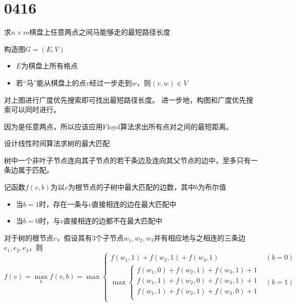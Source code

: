\section{0416}\label{sec:0416}
\begin{questions}\label{qset:0416}

    \question 求$n \times m$棋盘上任意两点之间马能够走的最短路径长度

    \begin{solution}
        构造图$G=(E,V)$\begin{itemize}
            \item $E$为棋盘上所有格点
            \item 若“马”能从棋盘上的点$v$经过一步走到$w$，则$(v,w) \in V$
        \end{itemize}

        对上图进行广度优先搜索即可找出最短路径长度。
        进一步地，构图和广度优先搜索可以同时进行。

        {
        \color{red}
        因为是任意两点，所以应该应用Floyd算法求出所有点对之间的最短距离。
        }

    \end{solution}

    \question 设计线性时间算法求树的最大匹配

    \begin{solution}
        树中一个非叶子节点连向其子节点的若干条边及连向其父节点的边中，至多只有一条边属于匹配。

        记函数$f(v, b)$为以$v$为根节点的子树中最大匹配的边数，其中$b$为布尔值\begin{itemize}
            \item 当$b=1$时，存在一条与$v$直接相连的边在最大匹配中
            \item 当$b=0$时，与$v$直接相连的边都不在最大匹配中
        \end{itemize}

        对于树的根节点$v$，假设其有3个子节点$w_1,w_2,w_3$并有相应地与之相连的三条边$e_1, e_2, e_3$，则
        \[
            f(v) = \max_b {f(v,b)} = \max \begin{cases}
                f(w_1,1) + f(w_2,1) + f(w_3,1) & (b=0) \\
                \max \begin{cases}
                    f(w_1,0) + f(w_2,1) + f(w_3,1) + 1 \\
                    f(w_1,1) + f(w_2,0) + f(w_3,1) + 1 \\
                    f(w_1,1) + f(w_2,1) + f(w_3,0) + 1 \\
                \end{cases} & (b=1)
            \end{cases}
        \]


\end{solution}
\end{questions}
